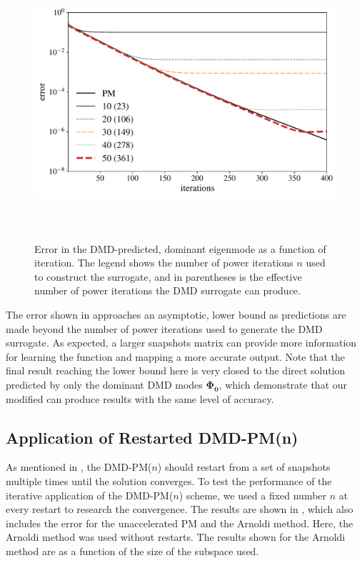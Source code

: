 \begin{figure}[htb]%
    \centering
    \includegraphics[height=4.0in]{tex/figures/skipahead.pdf}
   \caption{Error in the DMD-predicted, dominant eigenmode as a function of iteration.  The legend shows the number of power iterations $n$ used to construct the surrogate, and in parentheses is the effective number of power iterations the DMD surrogate can produce.}
  \label{fig:skipahead}
\end{figure}

The error shown in  approaches an asymptotic, lower bound as predictions are made beyond the number of power iterations used to generate the DMD surrogate.
As expected, a larger snapshots matrix can provide more information for learning the function and mapping a more accurate output.
Note that the final result reaching the lower bound here is very closed to the direct solution predicted by only the dominant DMD modes $\mathbf{\Phi_0}$, which demonstrate that our modified  can produce results with the same level of accuracy.

\subsection{Application of Restarted DMD-PM(n)}

As mentioned in , the DMD-PM($n$) should restart from a set of snapshots multiple times until the solution converges.
To test the performance of the iterative application of the DMD-PM($n$) scheme, we used a fixed number $n$ at every restart to research the convergence.  
The results are shown in , which also includes the error for the unaccelerated PM and the Arnoldi method.
Here, the Arnoldi method was used without restarts. 
The results shown for the Arnoldi method are as a function of the size of the subspace used.

